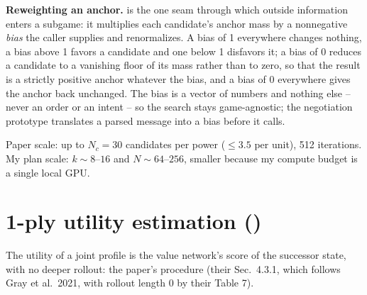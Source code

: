 \documentclass[12pt,a4paper]{article}
\begin{document}
\textbf{Reweighting an anchor.}
 is the one seam through which outside information enters a subgame: it multiplies each candidate's anchor mass by a nonnegative \emph{bias} the caller supplies and renormalizes.
A bias of 1 everywhere changes nothing, a bias above 1 favors a candidate and one below 1 disfavors it; a bias of 0 reduces a candidate to a vanishing floor of its mass rather than to zero, so that the result is a strictly positive anchor whatever the bias, and a bias of 0 everywhere gives the anchor back unchanged.
The bias is a vector of numbers and nothing else -- never an order or an intent -- so the search stays game-agnostic; the negotiation prototype translates a parsed message into a bias before it calls.

Paper scale: up to $N_c = 30$ candidates per power ($\le 3.5$ per unit), 512 iterations.
My plan scale: $k \sim 8$--$16$ and $N \sim 64$--$256$, smaller because my compute budget is a single local GPU.

\section{1-ply utility estimation (\texorpdfstring{}{rollout.py})}\label{sec:6}

The utility of a joint profile is the value network's score of the successor state, with no deeper rollout: the paper's procedure (their Sec.~4.3.1, which follows Gray et al.\ 2021, with rollout length 0 by their Table 7).
\end{document}

